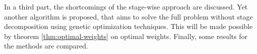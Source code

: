 In a third part, the shortcomings of the stage-wise approach are discussed.
Yet another algorithm is proposed, that aims to solve the full problem without stage decomposition using genetic optimization techniques.
This will be made possible by theorem \ref{thm:optimal-weights} on optimal weights.
Finally, some results for the methods are compared.
\begin{comment}
  \subsubsection{The Full MILP Model}
  Suppose we start with a (index) set $I$ of scenarios generated from the original stochastic process by sampling. For each node $k$ in the proposed tree structure, we introduce binary variables $z_{ki}$ which are 1 if node $k$ will take on the value of scenario $k$ of scenario $i \in I$ at the corresponding time step $t$, namely $\xi_i^t$. Using these variables, problem (\ref{eq:symbolic-optimization-with-minflow2}) can be formulated as the following MILP:
  \begin{eqnarray}
    \label{eq:full-milp-objective}
    &\min\limits_{\eta, q, z}&\sum_{i\in I}\sum_{j\in J}\sum_{t\in T}\eta_{ijt}c(\xi_i^t,\xi_j^t)\\
    \label{eq:full-milp-qsum}
    &\mathrm{s.t.}&\sum_{i\in I}\eta_{ijt} = q_j\\
    \label{eq:full-milp-psum}
    &&\sum_{j\in J}\eta_{ijt} = p_i\\
    \label{eq:full-milp-q-distribution}
    &&q_j = \sum_{k\in \mathrm{children}(j)}q_k\\
    \label{eq:full-milp-tree}
    &&\eta_{ijt} \leq \eta_{i,\mathrm{father}(j),t-1}\\
    \label{eq:full-milp-only-selected}
    &&\eta_{ijt} \leq z_{kj} \\%
    \label{eq:full-milp-contibounds}
    &&0\leq q \leq 1,\;0\leq \eta \leq 1\\
    \label{eq:full-milp-binarybounds}
    &&z\in \left\{0,1\right\}
  \end{eqnarray}
  \todo[inline]{ist das modell wirklich korrekt so? }
  The probability measures $q_{jt}$ and $\eta_{ijt}$ are modeled as probabilities for each scenario $j\in J$ of the tree. 
  Each scenario corresponds to a leaf node.
  Equations (\ref{eq:full-milp-qsum}) and (\ref{eq:full-milp-psum}) represent the requirements on the marginal probabilities of the measure $\eta$ (see (\ref{eq:define-borel-measures})).
  Equation \ref{eq:full-milp-q-distribution} ensures the consistency of the probabilities of the nodes.
  The inequalities \ref{eq:full-milp-tree} are constraints that preserve the filtration of the original scenarios.
  With the inequalities \ref{eq:full-milp-only-selected}, all variables $\eta_{ijt}$ that belong to nodes $j$ that 


\end{comment}
